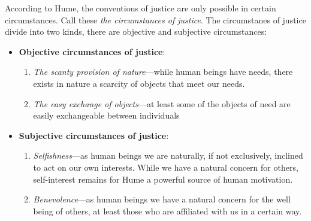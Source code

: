 
According to Hume, the conventions of justice are only possible in certain circumstances. Call these \emph{the circumstances of justice}. The circumstanes of justice divide into two kinds, there are objective and subjective circumstances:

\begin{itemize}
    \item \textbf{Objective circumstances of justice}:
        \begin{enumerate}
            \item \emph{The scanty provision of nature}---while human beings have needs, there exists in nature a scarcity of objects that meet our needs.
            \item \emph{The easy exchange of objects}---at least some of the objects of need are easily exchangeable between individuals
        \end{enumerate}
    \item \textbf{Subjective circumstances of justice}:
        \begin{enumerate}
            \item \emph{Selfishness}---as human beings we are naturally, if not exclusively, inclined to act on our own interests. While we have a natural concern for others, self-interest remains for Hume a powerful source of human motivation.
            \item \emph{Benevolence}---as human beings we have a natural concern for the well being of others, at least those who are affiliated with us in a certain way.
        \end{enumerate}
\end{itemize}

